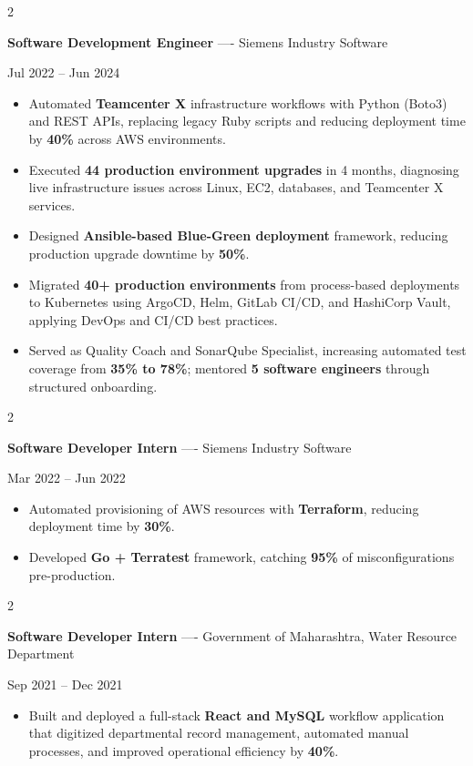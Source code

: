 \documentclass[10pt, letterpaper]{article}
\newenvironment{highlights}{
    \begin{itemize}[
        topsep=0.10 cm,
        parsep=0.06 cm,
        partopsep=0pt,
        itemsep=0.06 cm,
        leftmargin=12pt
    ]
}{
    \end{itemize}
}
\newenvironment{twocolentry}[2][]{
    \onecolentry
    \def\secondColumn{#2}
    \setcolumnwidth{\fill, 4.5 cm}
    \begin{paracol}{2}
}{
    \switchcolumn \raggedleft \secondColumn
    \end{paracol}
    \endonecolentry
}
\begin{document}
\vspace{0.15 cm}

\begin{twocolentry}{Jul 2022 -- Jun 2024}
\textbf{Software Development Engineer} ---- Siemens Industry Software
\end{twocolentry}
\begin{highlights}
  \item Automated \textbf{Teamcenter X} infrastructure workflows with Python (Boto3) and REST APIs, replacing legacy Ruby scripts and reducing deployment time by \textbf{40\%} across AWS environments.
  \item Executed \textbf{44 production environment upgrades} in 4 months, diagnosing live infrastructure issues across Linux, EC2, databases, and Teamcenter X services.
  \item Designed \textbf{Ansible-based Blue-Green deployment} framework, reducing production upgrade downtime by \textbf{50\%}.
  \item Migrated \textbf{40+ production environments} from process-based deployments to Kubernetes using ArgoCD, Helm, GitLab CI/CD, and HashiCorp Vault, applying DevOps and CI/CD best practices.
  \item Served as Quality Coach and SonarQube Specialist, increasing automated test coverage from \textbf{35\% to 78\%}; mentored \textbf{5 software engineers} through structured onboarding.
\end{highlights}

\vspace{0.15 cm}

\begin{twocolentry}{Mar 2022 -- Jun 2022}
\textbf{Software Developer Intern} ---- Siemens Industry Software
\end{twocolentry}
\begin{highlights}
  \item Automated provisioning of AWS resources with \textbf{Terraform}, reducing deployment time by \textbf{30\%}.
  \item Developed \textbf{Go + Terratest} framework, catching \textbf{95\%} of misconfigurations pre-production.
\end{highlights}

\vspace{0.15 cm}

\begin{twocolentry}{Sep 2021 -- Dec 2021}
\textbf{Software Developer Intern} ---- Government of Maharashtra, Water Resource Department
\end{twocolentry}
\begin{highlights}
  \item Built and deployed a full-stack \textbf{React and MySQL} workflow application that digitized departmental record management, automated manual processes, and improved operational efficiency by \textbf{40\%}.
\end{highlights}
\end{document}
